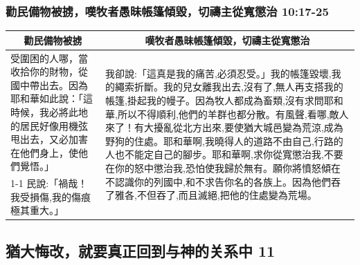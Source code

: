 \subsubsection{勸民備物被掳，嘆牧者愚昧帳篷傾毀，切禱主從寬懲治 10:17-25}
\begin{table}[H]
\centering
\begin{tabular}{p{}|p{12.750cm}}\hline\hline
\multicolumn{1}{c|}{勸民備物被掳}&\multicolumn{1}{c}{嘆牧者愚昧帳篷傾毀，切禱主從寬懲治}\\\hline
受圍困的人哪，當收拾你的財物，從國中帶出去。因為耶和華如此說：「這時候，我必將此地的居民好像用機弦甩出去，又必加害在他們身上，使他們覺悟。」
&\multirow{2}{12.8cm}{我卻說:「這真是我的痛苦,必須忍受。」我的帳篷毀壞,我的繩索折斷。我的兒女離我出去,沒有了,無人再支搭我的帳篷,掛起我的幔子。因為牧人都成為畜類,沒有求問耶和華,所以不得順利,他們的羊群也都分散。有風聲,看哪,敵人來了！有大擾亂從北方出來,要使猶大城邑變為荒涼,成為野狗的住處。耶和華啊,我曉得人的道路不由自己,行路的人也不能定自己的腳步。耶和華啊,求你從寬懲治我,不要在你的怒中懲治我,恐怕使我歸於無有。願你將憤怒傾在不認識你的列國中,和不求告你名的各族上。因為他們吞了雅各,不但吞了,而且滅絕,把他的住處變為荒場。}\\\cline{1-1}
民說:「禍哉！我受損傷,我的傷痕極其重大。」&\\\hline
\end{tabular}
\end{table}

\subsection{猶大悔改，就要真正回到与神的关系中 11}
